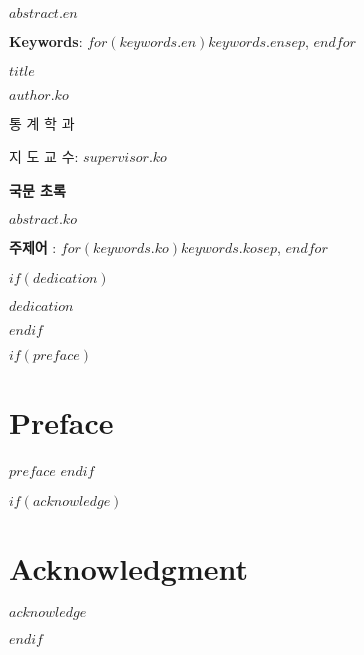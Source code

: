\documentclass[$fontsize$]{report}
\begin{document}
$abstract.en$

\par\vspace{20pt}
\textbf{Keywords}: $for(keywords.en)$$keywords.en$$sep$, $endfor$

\newpage
\begin{center}
\onehalfspacing
\LARGE $title$ %
\par\vspace{20pt}

\normalsize\doublespacing
$author.ko$\par %
통 계 학 과\par %
지 도 교 수:  $supervisor.ko$
\par\vspace{20pt}
\large \textbf{국문 초록}
\end{center}
\normalsize\doublespacing

$abstract.ko$

\par \vspace{20pt}
\textbf{주제어} : $for(keywords.ko)$$keywords.ko$$sep$, $endfor$

$if(dedication)$
\newpage
\begin{center}
$dedication$
\end{center}
\doublespacing
\vfill
$endif$


$if(preface)$
\newpage
\chapter*{Preface}
\normalsize
$preface$
$endif$


$if(acknowledge)$
\newpage
\chapter*{Acknowledgment}
\normalsize
$acknowledge$\par
$endif$


\renewcommand*\contentsname{Table of Contents}
\tableofcontents

\bigskip
\end{document}

